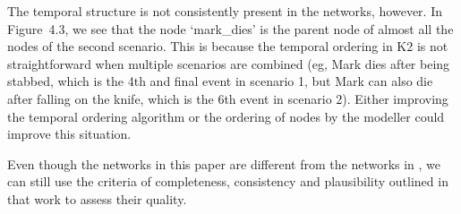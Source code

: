 The temporal structure is not consistently present in the networks, however. In Figure~4.3, we see that the node `mark\_dies' is the parent node of almost all the nodes of the second scenario. This is because the temporal ordering in K2 is not straightforward when multiple scenarios are combined (eg, Mark dies after being stabbed, which is the 4th and final event in scenario 1, but Mark can also die after falling on the knife, which is the 6th event in scenario 2). Either improving the temporal ordering algorithm or the ordering of nodes by the modeller could improve this situation. 

Even though the networks in this paper are different from the networks in \citet{Vlek2015}, we can still use the criteria of completeness, consistency and plausibility outlined in that work to assess their quality.

